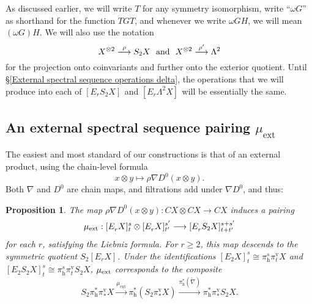 \documentclass[11pt]{amsart} \renewcommand{\baselinestretch}{1.2}
\theoremstyle{plain}
\newtheorem{prop}[thm]{Proposition}
\numberwithin{equation}{section} %
\theoremstyle{plain}
\newtheorem{prop}[thm]{Proposition}
\numberwithin{equation}{chapter} %
\renewcommand{\to}{\longrightarrow}
\newcommand{\scrC}{\mathscr{C}}
\newcommand{\ExtCohProd}{\mu_\mathrm{ext}}
\newcommand{\twist}{\omega}
\newcommand{\Nabla}{\nabla}
\newcommand{\algs}{{\scrC\!\textit{\normalfont\textit{om}}}}
\newcommand{\E}[5]{[E^{#1}_{#2}#3]^{#4}_{#5}}
\newcommand{\Edownup}[5]{[E_{#1}^{#2}#3]^{#4}_{#5}}
\newcommand{\uver}{^\mathrm{v}}
\newcommand{\dhor}{_\mathrm{h}}
\renewcommand{\mapsto}{\longmapsto}
\newcommand{\SubsectionOrSection}[1]{\subsection{#1}}
\begin{document}
\begin{second quadrant homotopy sseq operations}
As discussed earlier, we will write $T$ for any symmetry isomorphism, write ``$\twist G$'' as shorthand for the function $TGT$, and  whenever we write $\twist GH$, we will mean $(\twist G)H$. We will also use the notation
\[X^{\otimes2}\overset{\rho}{\to}S_2X\textup{\ \ and\ \ }X^{\otimes2}\overset{\rho'}{\to}\Lambda^2
\]
for the projection onto coinvariants and further onto the exterior quotient. Until \S\ref{External spectral sequence operations delta}, the operations that we will produce into each of $\Edownup{r}{}{S_2X}{}{}$ and $\Edownup{r}{}{\Lambda^2X}{}{}$ will be essentially the same.
\SubsectionOrSection{An external spectral sequence pairing $\mu_\mathrm{ext}$}
The easiest and most standard of our constructions is that of an external product, using 
the chain-level formula
\[x\otimes y\mapsto\rho\Nabla D^0(x\otimes y).\]
Both $\Nabla$ and $D^0$ are chain maps, and filtrations add under $\Nabla D^0$, and thus:
\begin{prop}
\label{prop on basic product}
The map $\rho\Nabla D^0(x\otimes y):CX\otimes CX\to CX$ induces a pairing
\[\mu_\textup{ext}:\Edownup{r}{}{X}{s}{t}\otimes \Edownup{r}{}{X}{s'}{t'}\to \Edownup{r}{}{S_2X}{s+s'}{t+t'}\]
for each $r$, satisfying the Liebniz formula. For $r\geq2$, this map descends to the symmetric quotient $S_2\Edownup{r}{}{X}{}{}$. Under the identifications $\Edownup{2}{}{X}{s}{t}\cong \pi\dhor^s\pi\uver_t X$ and $\Edownup{2}{}{S_2X}{s}{t}\cong \pi\dhor^s\pi\uver_t S_2X$, $\mu_\textup{ext}$ corresponds to the composite
\[S_2\pi\dhor^*\pi\uver_* X
\overset{\ExtCohProd}{\to} 
\pi\dhor^*(S_2\pi\uver_* X)
\overset{\pi\dhor^{*}(\widetilde{\nabla})}{\to}
\pi\dhor^{*}\pi\uver_{*}S_2 X.\]
\end{prop}
%

\end{second quadrant homotopy sseq operations}
\end{document}

